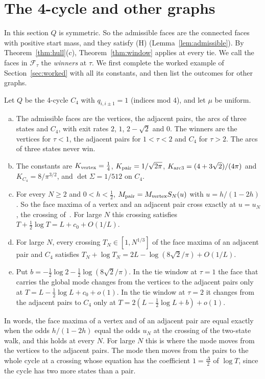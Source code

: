 \section{The 4-cycle and other graphs}\label{sec:examples}

In this section $Q$ is symmetric. So the admissible faces are the connected
faces with positive start mass, and they satisfy (H)
(Lemma~\ref{lem:admissible}). By Theorem~\ref{thm:hull}(c),
Theorem~\ref{thm:window} applies at every tie. We call the faces in
$\mathcal F_\tau$ the \emph{winners} at $\tau$. We first complete the worked
example of Section~\ref{sec:worked} with all its constants, and then list the
outcomes for other graphs.

\begin{corollary}\label{cor:C4}
Let $Q$ be the 4-cycle $C_4$ with $q_{i,i\pm1}=1$ (indices mod $4$), and let
$\mu$ be uniform.
\begin{enumerate}[(a)]
\item The admissible faces are the vertices, the adjacent pairs, the arcs of
three states and $C_4$, with exit rates $2$, $1$, $2-\sqrt2$ and $0$. The
winners are the vertices for $\tau<1$, the adjacent pairs for $1<\tau<2$ and
$C_4$ for $\tau>2$. The arcs of three states never win.
\item The constants are $K_{\rm vertex}=\frac14$, $K_{\rm pair}=1/\sqrt{2\pi}$,
$K_{\rm arc3}=(4+3\sqrt2)/(4\pi)$ and $K_{C_4}=8/\pi^{3/2}$, and
$\det\Sigma=1/512$ on $C_4$.
\item For every $N\ge2$ and $0<h<\frac12$, $M_{\rm pair}=M_{\rm vertex}S_N(u)$
with $u=h/(1-2h)$. So the face maxima of a vertex and an adjacent pair cross
exactly at $u=u_N$, the crossing of~\cite{paperA}. For large $N$ this
crossing satisfies $T+\frac12\log T=L+c_0+O(1/L)$.
\item For large $N$, every crossing $T_N\in[1,N^{1/3}]$ of the face maxima of
an adjacent pair and $C_4$ satisfies $T_N+\log T_N=2L-\log(8\sqrt2/\pi)+O(1/L)$.
\item Put $b=-\frac12\log2-\frac12\log(8\sqrt2/\pi)$. In the tie window at
$\tau=1$ the face that carries the global mode changes from the vertices to
the adjacent pairs only at $T=L-\frac12\log L+c_0+o(1)$. In the tie window at
$\tau=2$ it changes from the adjacent pairs to $C_4$ only at
$T=2(L-\frac12\log L+b)+o(1)$.
\end{enumerate}
\end{corollary}

In words, the face maxima of a vertex and of an adjacent pair are equal exactly when the odds
$h/(1-2h)$ equal the odds $u_N$ at the crossing of the two-state walk, and this holds at every $N$.
For large $N$ this is where the mode moves from the vertices to the adjacent pairs. The mode
then moves from the pairs to the whole cycle at a
crossing whose equation has the coefficient $1=\frac\Delta2$ of $\log T$, since
the cycle has two more states than a pair.

